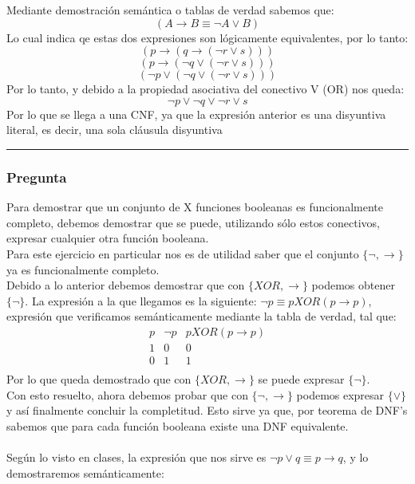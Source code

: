\documentclass[12pt]{article}
\begin{document}

Mediante demostración semántica o tablas de verdad sabemos que:
\[ (A \rightarrow B \equiv \neg A \lor B )\]
Lo cual indica qe estas dos expresiones son lógicamente equivalentes, por lo tanto:
\[ (p \rightarrow (q \rightarrow (\neg r \lor s)))\] %
\[ (p \rightarrow (\neg q \lor (\neg r \lor s)))\] %
\[ (\neg p \lor (\neg q \lor (\neg r \lor s)))\] %
Por lo tanto, y debido a la propiedad asociativa del conectivo V (OR) nos queda:
\[ \neg p \lor \neg q \lor \neg r \lor s\]
Por lo que se llega a una CNF, ya que la expresión anterior es una disyuntiva literal, es decir,
una sola cláusula disyuntiva

\rule{\linewidth}{0.4pt}



\subsubsection*{Pregunta }

Para demostrar que un conjunto de X funciones booleanas es funcionalmente completo, debemos demostrar
que se puede, utilizando sólo estos conectivos, expresar cualquier otra función booleana.
\\Para este ejercicio en particular nos es de utilidad saber que el conjunto $\{\neg, \rightarrow \}$ ya es funcionalmente completo.
\\ Debido a lo anterior debemos demostrar que con $\{XOR, \rightarrow\}$ podemos obtener $\{\neg\}$.
La expresión a la que llegamos es la siguiente: $\neg p \equiv p XOR (p \rightarrow p)$, expresión que verificamos
semánticamente mediante la tabla de verdad, tal que:
\[
\begin{array}{c|c|c}
p & \neg p & p XOR(p \rightarrow p) \\ \hline
1 & 0 & 0 \\
0 & 1 & 1 \\
\end{array}
\]
Por lo que queda demostrado que con $\{XOR, \rightarrow\}$ se puede expresar $\{\neg\}$.
\\Con esto resuelto, ahora debemos probar que con $\{\neg, \rightarrow \}$ podemos expresar $\{\lor\}$ y así finalmente concluir la completitud.
Esto sirve ya que, por teorema de DNF's sabemos que para cada función booleana existe una DNF equivalente.
\\ \\Según lo visto en clases, la expresión que nos sirve es $\neg p \lor q \equiv p \rightarrow q$, y lo demostraremos semánticamente:
\end{document}
